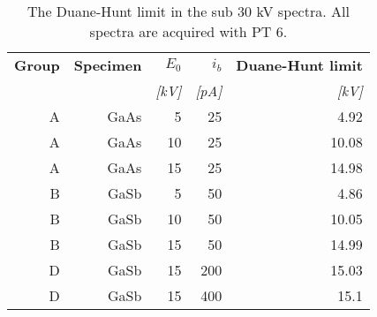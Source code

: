 \begin{table}[hbtp]
    \begin{center}
        \caption{
            The Duane-Hunt limit in the sub $30$ kV spectra.
            All spectra are acquired with PT $6$.
        }
        \label{tab:results:duane_hunt}
        \begin{tabular}{rrrrr}
            \hline
            \textbf{Group} & \textbf{Specimen} & \textbf{$E_0$} & \textbf{$i_b$} & \textbf{Duane-Hunt limit} \\
            \emph{}        & \emph{}           & \emph{[kV]}    & \emph{[pA]}    & \emph{[kV]}               \\
            \hline
            A              & GaAs              & 5              & 25             & 4.92                      \\
            A              & GaAs              & 10             & 25             & 10.08                     \\
            A              & GaAs              & 15             & 25             & 14.98                     \\
            B              & GaSb              & 5              & 50             & 4.86                      \\
            B              & GaSb              & 10             & 50             & 10.05                     \\
            B              & GaSb              & 15             & 50             & 14.99                     \\
            D              & GaSb              & 15             & 200            & 15.03                     \\
            D              & GaSb              & 15             & 400            & 15.1                      \\
            \hline
        \end{tabular}
    \end{center}
\end{table}
